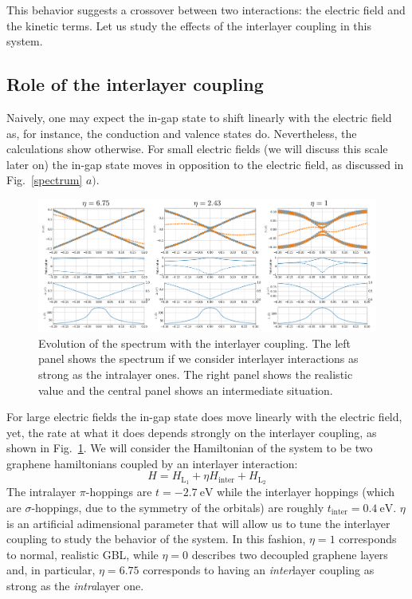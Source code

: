 This behavior suggests a crossover between two interactions: the electric field and the kinetic terms. Let us study the effects of the interlayer coupling in this system.


\subsection{Role of the interlayer coupling}
Naively, one may expect the in-gap state to shift linearly with the electric field as, for instance, the conduction and valence states do. Nevertheless, the calculations show otherwise.
For small electric fields (we will discuss this scale later on) the in-gap state moves in opposition to the electric field, as discussed in Fig.~\ref{spectrum} $a)$.
\begin{figure}[!ht!]
\centering
\includegraphics{artlat/fig/ingap_interlayer.pdf}
\vspace{-15pt}
\caption{Evolution of the spectrum with the interlayer coupling. The left panel shows the spectrum if we consider interlayer interactions as strong as the intralayer ones. The right panel shows the realistic value and the central panel shows an intermediate situation.}
\label{ingap_interlayer}
\end{figure}
For large electric fields the in-gap state does move linearly with the electric field, yet, the rate at what it does depends strongly on the interlayer coupling, as shown in Fig.~\ref{ingap_interlayer}.
We will consider the Hamiltonian of the system to be two graphene hamiltonians coupled by an interlayer interaction:
\begin{equation}
  H = H_{\text{L}_1} + \eta H_{\text{inter}} + H_{\text{L}_2}
\end{equation}
The intralayer $\pi$-hoppings are $t=\SI{-2.7}{\eV}$ while the interlayer hoppings (which are $\sigma$-hoppings, due to the symmetry of the orbitals) are roughly $t_{\text{inter}}=\SI{0.4}{\eV}$. $\eta$ is an artificial adimensional parameter that will allow us to tune the interlayer coupling to study the behavior of the system. In this fashion, $\eta=1$ corresponds to normal, realistic GBL, while $\eta=0$ describes two decoupled graphene layers and, in particular, $\eta=6.75$ corresponds to having an \emph{inter}layer coupling as strong as the \emph{intra}layer one.\\

